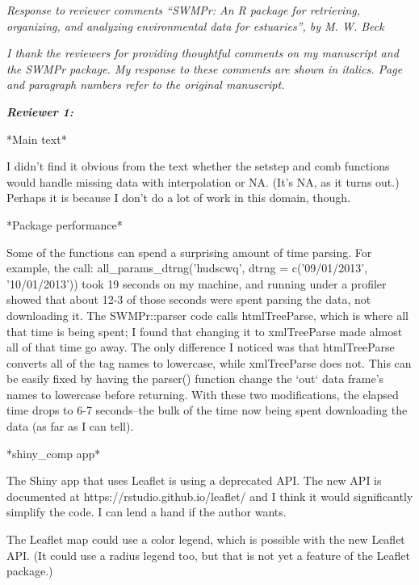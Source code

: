 \documentclass[letterpaper,12pt]{article}\usepackage[]{graphicx}\usepackage[]{color}
\newcommand{\Bigtxt}[1]{\textbf{\textit{#1}}}
\begin{document}
\raggedright


{\it Response to reviewer comments ``SWMPr: An R package for retrieving, organizing, and analyzing environmental data for estuaries'', by M. W. Beck}

{\it I thank the reviewers for providing thoughtful comments on my manuscript and the SWMPr package.  My response to these comments are shown in italics.  Page and paragraph numbers refer to the original manuscript.}

\Bigtxt{Reviewer 1:}

*Main text*

I didn't find it obvious from the text whether the setstep and comb functions would handle missing data with interpolation or NA. (It's NA, as it turns out.) Perhaps it is because I don't do a lot of work in this domain, though.

*Package performance*

Some of the functions can spend a surprising amount of time parsing. For example, the call: all\_params\_dtrng('hudscwq', dtrng = c('09/01/2013', '10/01/2013')) took 19 seconds on my machine, and running under a profiler showed that about 12-3 of those seconds were spent parsing the data, not downloading it. The SWMPr::parser code calls htmlTreeParse, which is where all that time is being spent; I found that changing it to xmlTreeParse made almost all of that time go away. The only difference I noticed was that htmlTreeParse converts all of the tag names to lowercase, while xmlTreeParse does not. This can be easily fixed by having the parser() function change the `out` data frame's names to lowercase before returning. With these two modifications, the elapsed time drops to 6-7 seconds--the bulk of the time now being spent downloading the data (as far as I can tell).

*shiny\_comp app*

The Shiny app that uses Leaflet is using a deprecated API. The new API is documented at https://rstudio.github.io/leaflet/ and I think it would significantly simplify the code. I can lend a hand if the author wants.

The Leaflet map could use a color legend, which is possible with the new Leaflet API. (It could use a radius legend too, but that is not yet a feature of the Leaflet package.)
\end{document}
